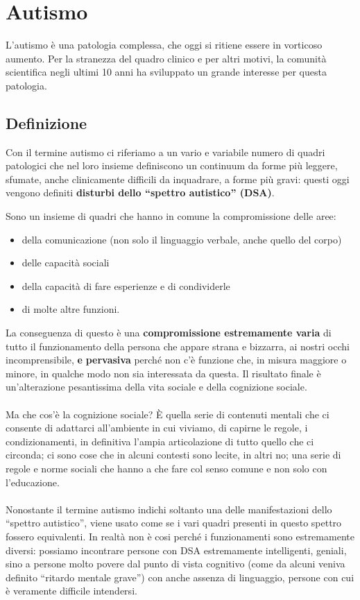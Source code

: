 \section{Autismo}

L'autismo è una patologia complessa, che oggi si ritiene essere in
vorticoso aumento. Per la stranezza del quadro clinico e per altri
motivi, la comunità scientifica negli ultimi 10 anni ha sviluppato un
grande interesse per questa patologia.

\subsection{Definizione}

Con il termine autismo ci riferiamo a un vario e variabile numero di
quadri patologici che nel loro insieme definiscono un continuum da forme
più leggere, sfumate, anche clinicamente difficili da inquadrare, a
forme più gravi: questi oggi vengono definiti \textbf{disturbi dello
``spettro autistico'' (DSA)}.

Sono un insieme di quadri che hanno in comune la compromissione delle
aree:

\begin{itemize}
\item
  della comunicazione (non solo il linguaggio verbale, anche quello del
  corpo)
\item
  delle capacità sociali
\item
  della capacità di fare esperienze e di condividerle
\item
  di molte altre funzioni.
\end{itemize}

La conseguenza di questo è una \textbf{compromissione estremamente
varia} di tutto il funzionamento della persona che appare strana e
bizzarra, ai nostri occhi incomprensibile, \textbf{e} \textbf{pervasiva}
perché non c'è funzione che, in misura maggiore o minore, in qualche
modo non sia interessata da questa. Il risultato finale è un'alterazione
pesantissima della vita sociale e della cognizione sociale.
\\\\
Ma che cos'è la cognizione sociale? È quella serie di contenuti mentali
che ci consente di adattarci all'ambiente in cui viviamo, di capirne le
regole, i condizionamenti, in definitiva l'ampia articolazione di tutto
quello che ci circonda; ci sono cose che in alcuni contesti sono lecite,
in altri no; una serie di regole e norme sociali che hanno a che fare
col senso comune e non solo con l'educazione.
\\\\
Nonostante il termine autismo indichi soltanto una delle manifestazioni
dello ``spettro autistico'', viene usato come se i vari quadri presenti
in questo spettro fossero equivalenti. In realtà non è cosi perché i
funzionamenti sono estremamente diversi: possiamo incontrare persone con
DSA estremamente intelligenti, geniali, sino a persone molto povere dal
punto di vista cognitivo (come da alcuni veniva definito ``ritardo
mentale grave'') con anche assenza di linguaggio, persone con cui è
veramente difficile intendersi.

